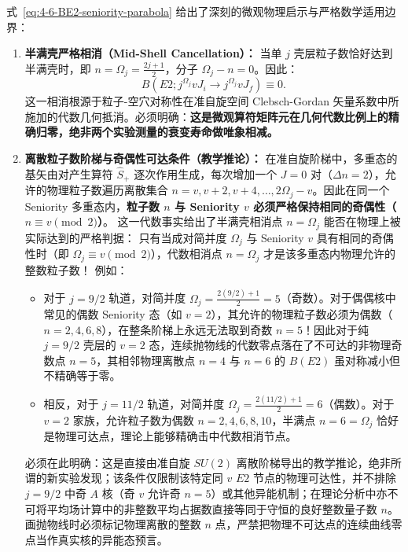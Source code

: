 式~\eqref{eq:4-6-BE2-seniority-parabola} 给出了深刻的微观物理启示与严格数学适用边界：
\begin{enumerate}
\item \textbf{半满壳严格相消（Mid-Shell Cancellation）：}
当单 $j$ 壳层粒子数恰好达到半满壳时，即 $n = \Omega_j = \frac{2j+1}{2}$，分子 $\Omega_j - n = 0$。因此：
\begin{equation}\label{eq:4-6-cancellation-vanish}
B(E2; j^{\Omega_j} v J_i \to j^{\Omega_j} v J_f) \equiv 0.
\end{equation}
这一相消根源于粒子-空穴对称性在准自旋空间 Clebsch-Gordan 矢量系数中所施加的代数几何抵消。必须明确：\textbf{这是微观算符矩阵元在几何代数比例上的精确归零，绝非两个实验测量的衰变寿命做唯象相减。}
\item \textbf{离散粒子数阶梯与奇偶性可达条件（教学推论）：}
在准自旋阶梯中，多重态的基矢由对产生算符 $\hat{S}_+$ 逐次作用生成，每次增加一个 $J=0$ 对（$\Delta n = 2$），允许的物理粒子数遍历离散集合 $n = v, v+2, v+4, \dots, 2\Omega_j - v$。因此在同一个 Seniority 多重态内，\textbf{粒子数 $n$ 与 Seniority $v$ 必须严格保持相同的奇偶性（$n \equiv v \pmod 2$）}。
这一代数事实给出了半满壳相消点 $n = \Omega_j$ 能否在物理上被实际达到的严格判据：
只有当成对简并度 $\Omega_j$ 与 Seniority $v$ 具有相同的奇偶性时（即 $\Omega_j \equiv v \pmod 2$），代数相消点 $n = \Omega_j$ 才是该多重态内物理允许的整数粒子数！
例如：
\begin{itemize}
\item 对于 $j = 9/2$ 轨道，对简并度 $\Omega_j = \frac{2(9/2)+1}{2} = 5$（奇数）。对于偶偶核中常见的偶数 Seniority 态（如 $v = 2$），其允许的物理粒子数必须为偶数（$n = 2, 4, 6, 8$），在整条阶梯上永远无法取到奇数 $n = 5$！因此对于纯 $j = 9/2$ 壳层的 $v = 2$ 态，连续抛物线的代数零点落在了不可达的非物理奇数点 $n=5$，其相邻物理离散点 $n=4$ 与 $n=6$ 的 $B(E2)$ 虽对称减小但不精确等于零。
\item 相反，对于 $j = 11/2$ 轨道，对简并度 $\Omega_j = \frac{2(11/2)+1}{2} = 6$（偶数）。对于 $v = 2$ 家族，允许粒子数为偶数 $n = 2, 4, 6, 8, 10$，半满点 $n = 6 = \Omega_j$ 恰好是物理可达点，理论上能够精确击中代数相消节点。
\end{itemize}
必须在此明确：这是直接由准自旋 $SU(2)$ 离散阶梯导出的教学推论，绝非所谓的新实验发现；该条件仅限制该特定同 $v$ $E2$ 节点的物理可达性，并不排除 $j = 9/2$ 中奇 $A$ 核（奇 $v$ 允许奇 $n=5$）或其他异能机制；在理论分析中亦不可将平均场计算中的非整数平均占据数直接等同于守恒的良好整数量子数 $n$。画抛物线时必须标记物理离散的整数 $n$ 点，严禁把物理不可达点的连续曲线零点当作真实核的异能态预言。


\end{enumerate}
